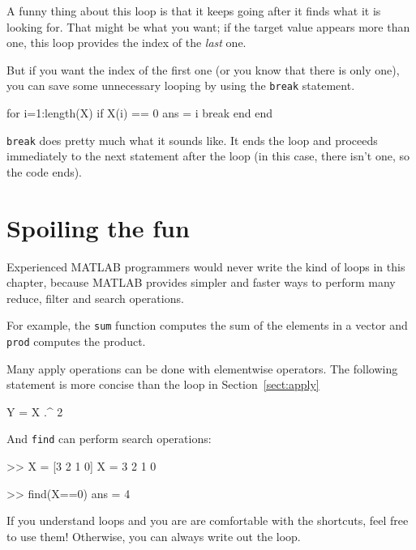 \documentclass[
]{book}
\numberwithin{Answer}{chapter}
\numberwithin{Exercise}{chapter}
\begin{document}
A funny thing about this loop is that it keeps going after it
finds what it is looking for.  That might be what you want; if the
target value appears more than one, this loop provides the index
of the {\em last} one.


But if you want the index of the first one (or you know that there
is only one), you can save some unnecessary looping by using the
{\tt break} statement.

\begin{code}
for i=1:length(X)
    if X(i) == 0
        ans = i
        break
    end
end
\end{code}

{\tt break} does pretty much what it sounds like.  It ends the
loop and proceeds immediately to the next statement after the
loop (in this case, there isn't one, so the code ends).


\section{Spoiling the fun}

Experienced MATLAB programmers would never write the kind of loops
in this chapter, because MATLAB provides simpler and faster ways to
perform many reduce, filter and search operations.


For example, the {\tt sum} function computes the sum of the elements
in a vector and {\tt prod} computes the product.

Many apply operations can be done with elementwise operators.
The following statement is more concise than the loop in
Section~\ref{sect:apply}

\begin{code}
Y = X .^ 2
\end{code}

And {\tt find} can perform search operations:

\begin{code}
>> X = [3 2 1 0]
X = 3     2     1     0

>> find(X==0)
ans = 4
\end{code}

If you understand loops and you are are comfortable with the
shortcuts, feel free to use them!  Otherwise, you can always write
out the loop.
\end{document}
